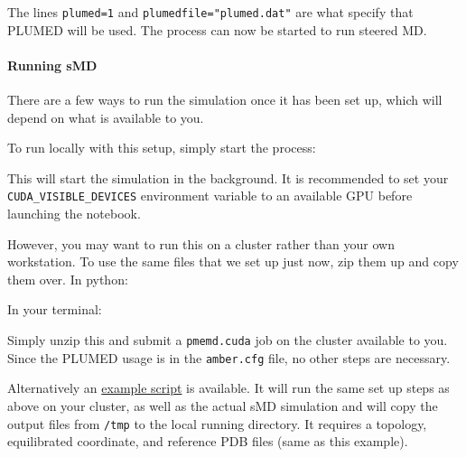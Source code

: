 The lines \texttt{plumed=1} and \texttt{plumedfile="plumed.dat"} are
what specify that PLUMED will be used. The process can now be started to
run steered MD.

\hypertarget{running-smd}{%
\paragraph{Running sMD}\label{running-smd}}

There are a few ways to run the simulation once it has been set up,
which will depend on what is available to you.

To run locally with this setup, simply start the process:

\begin{Shaded}
\begin{Highlighting}[]
\end{Highlighting}
\end{Shaded}

This will start the simulation in the background. It is recommended to
set your \texttt{CUDA\_VISIBLE\_DEVICES} environment variable to an
available GPU before launching the notebook.

However, you may want to run this on a cluster rather than your own
workstation. To use the same files that we set up just now, zip them up
and copy them over. In python:

\begin{Shaded}
\begin{Highlighting}[]
\end{Highlighting}
\end{Shaded}

In your terminal:

\begin{Shaded}
\begin{Highlighting}[]
\end{Highlighting}
\end{Shaded}

Simply unzip this and submit a \texttt{pmemd.cuda} job on the cluster
available to you. Since the PLUMED usage is in the \texttt{amber.cfg}
file, no other steps are necessary.

Alternatively an \href{01_run_sMD.py}{example script} is available. It
will run the same set up steps as above on your cluster, as well as the
actual sMD simulation and will copy the output files from \texttt{/tmp}
to the local running directory. It requires a topology, equilibrated
coordinate, and reference PDB files (same as this example).
